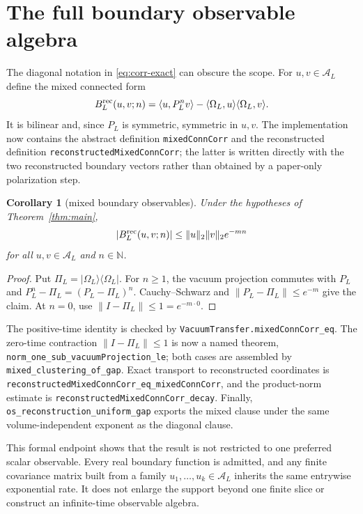 \documentclass[11pt]{article}
\newtheorem{corollary}[theorem]{Corollary}
\theoremstyle{definition}
\theoremstyle{remark}
\newcommand{\cA}{\mathcal{A}}
\newcommand{\lean}[1]{\nolinkurl{#1}}
\begin{document}
\section{The full boundary observable algebra}
\label{sec:observables}

The diagonal notation in \eqref{eq:corr-exact} can obscure the scope.  For
$u,v\in\cA_L$ define the mixed connected form
\[
  B^{\rm rec}_L(u,v;n)
  =\langle u,P_L^nv\rangle
   -\langle\Omega_L,u\rangle\langle\Omega_L,v\rangle.
\]
It is bilinear and, since $P_L$ is symmetric, symmetric in $u,v$.  The
implementation now contains the abstract definition \lean{mixedConnCorr} and
the reconstructed definition \lean{reconstructedMixedConnCorr}; the latter is
written directly with the two reconstructed boundary vectors rather than
obtained by a paper-only polarization step.

\begin{corollary}[mixed boundary observables]
\label{cor:mixed}
Under the hypotheses of Theorem~\ref{thm:main},
\[
  |B^{\rm rec}_L(u,v;n)|
  \leq\|u\|_2\|v\|_2e^{-mn}
\]
for all $u,v\in\cA_L$ and $n\in\mathbb N$.
\end{corollary}

\begin{proof}
Put $\Pi_L=|\Omega_L\rangle\langle\Omega_L|$.  For $n\geq1$, the vacuum
projection commutes with $P_L$ and
$P_L^n-\Pi_L=(P_L-\Pi_L)^n$.  Cauchy--Schwarz and
$\|P_L-\Pi_L\|\leq e^{-m}$ give the claim.  At $n=0$, use
$\|I-\Pi_L\|\leq1=e^{-m\cdot0}$.
\end{proof}

The positive-time identity is checked by
\lean{VacuumTransfer.mixedConnCorr\_eq}.  The zero-time contraction
$\|I-\Pi_L\|\leq1$ is now a named theorem,
\lean{norm\_one\_sub\_vacuumProjection\_le}; both cases are assembled by
\lean{mixed\_clustering\_of\_gap}.  Exact transport to reconstructed
coordinates is \lean{reconstructedMixedConnCorr\_eq\_mixedConnCorr}, and the
product-norm estimate is \lean{reconstructedMixedConnCorr\_decay}.  Finally,
\lean{os\_reconstruction\_uniform\_gap} exports the mixed clause under the
same volume-independent exponent as the diagonal clause.

This formal endpoint shows that the result is not restricted to one preferred
scalar observable.  Every real boundary function is admitted, and any finite
covariance matrix built from a family $u_1,\ldots,u_k\in\cA_L$ inherits the
same entrywise exponential rate.  It does not enlarge the support beyond one
finite slice or construct an infinite-time observable algebra.
\end{document}

